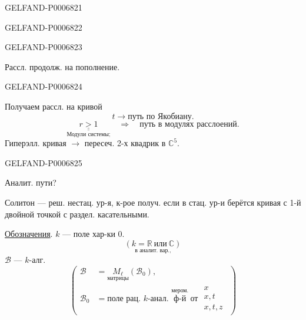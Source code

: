 \begin{GelfandAdjacentEvidence}{GELFAND-P000682}{1}
\end{GelfandAdjacentEvidence}
\begin{GelfandAdjacentEvidence}{GELFAND-P000682}{2}

\end{GelfandAdjacentEvidence}
\begin{GelfandAdjacentEvidence}{GELFAND-P000682}{3}


Рассл. продолж. на пополнение.
\end{GelfandAdjacentEvidence}
\begin{GelfandAdjacentEvidence}{GELFAND-P000682}{4}

Получаем рассл. на кривой
\[
t\longrightarrow\text{путь по Якобиану.}
\]
\[
\underset{\text{Модули системы;}}{\underline{\underline{r>1}}}
\quad\Rightarrow\quad\text{путь в модулях расслоений.}
\]
Гиперэлл. кривая \(\longrightarrow\) пересеч. 2-х квадрик в \(\mathbb C^5\).
\end{GelfandAdjacentEvidence}
\begin{GelfandAdjacentEvidence}{GELFAND-P000682}{5}

Аналит. пути?

Солитон --- реш. нестац. ур-я, к-рое получ. если в стац. ур-и берётся кривая с 1-й двойной точкой с раздел. касательными.

\underline{Обозначения}. \(k\) --- поле хар-ки 0.
\[
\underset{\text{в аналит. вар.,}}{(k=\mathbb R\ \text{или}\ \mathbb C)}
\]
\(\mathcal B\) --- \(k\)-алг.
\[
\left(\begin{aligned}
\mathcal B&=\underset{\text{матрицы}}{M_\ell}(\mathcal B_0),\\
\mathcal B_0&=\text{поле рац. }k\text{-анал. }
          \overset{\text{мером.}}{\text{ф-й}}\ \text{от }
          \begin{matrix}x\\x,t\\x,t,z\end{matrix}
\end{aligned}\right)
\]
\end{GelfandAdjacentEvidence}
